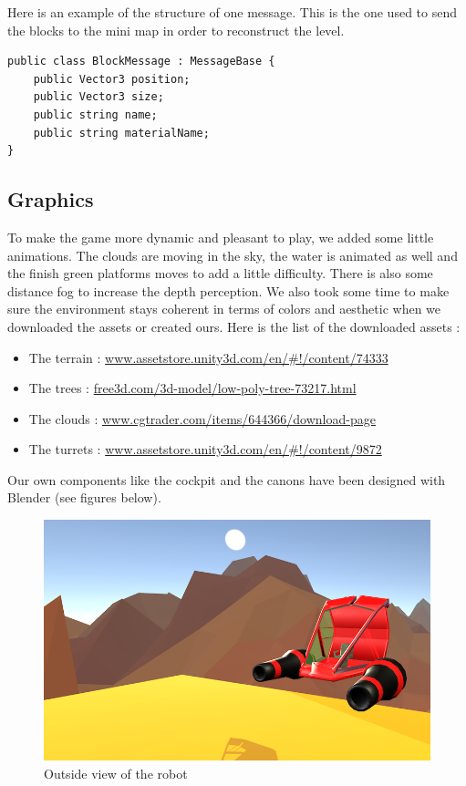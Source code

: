\documentclass[12pt]{article}
\begin{document}
Here is an example of the structure of one message. This is the one used to send the blocks to the mini map in order to reconstruct the level.

\begin{lstlisting}
public class BlockMessage : MessageBase {
	public Vector3 position;
	public Vector3 size;
	public string name;
	public string materialName;
}
\end{lstlisting}

\subsection{Graphics}

To make the game more dynamic and pleasant to play, we added some little animations. The clouds are moving in the sky, the water is animated as well and the finish green platforms moves to add a little difficulty. There is also some distance fog to increase the depth perception. We also took some time to make sure the environment stays coherent in terms of colors and aesthetic when we downloaded the assets or created ours. Here is the list of the downloaded assets :

\begin{itemize}
	\item The terrain : \href{https://www.assetstore.unity3d.com/en/#!/content/74333}{www.assetstore.unity3d.com/en/\#!/content/74333}
	\item The trees : \href{https://free3d.com/3d-model/low-poly-tree-73217.html}{free3d.com/3d-model/low-poly-tree-73217.html}
	\item The clouds : \href{https://www.cgtrader.com/items/644366/download-page}{www.cgtrader.com/items/644366/download-page}
	\item The turrets : \href{https://www.assetstore.unity3d.com/en/#!/content/9872}{www.assetstore.unity3d.com/en/\#!/content/9872}
\end{itemize}

Our own components like the cockpit and the canons have been designed with Blender (see figures below).

\begin{figure}[!h]
   \caption{\label{étiquette} Outside view of the robot}
   \includegraphics[scale=0.53]{images/ship.png}
\end{figure}
\end{document}
